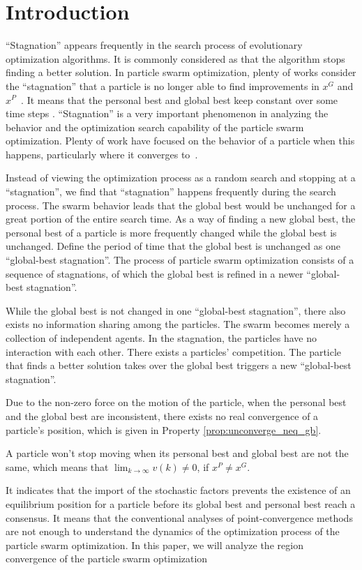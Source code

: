 \section{Introduction}
\label{sec:introduction}

``Stagnation'' appears frequently in the search process of evolutionary optimization algorithms. 
It is commonly considered as that the algorithm stops finding a better solution.
In particle swarm optimization,
plenty of works consider the ``stagnation'' that a particle is no longer able to find improvements in $ x^{G} $ and $ x^{P} $~\cite{Clerc06stagnationanalysis}.
It means that the personal best and global best keep constant over some time steps \cite{4223160}.
``Stagnation'' is a very important phenomenon in analyzing the behavior and the optimization search capability of the particle swarm optimization.
Plenty of work have focused on the behavior of a particle when this happens, particularly where it converges to~\cite{Schmitt:2013:PSO:2463372.2463563}\cite{Poli:2008:DSS:1384929.1384944}.

Instead of viewing the optimization process as a random search and stopping at a ``stagnation'', we find that ``stagnation'' happens frequently during the search process.
The swarm behavior leads that the global best would be unchanged for a great portion of the entire search time.
As a way of finding a new global best, the personal best of a particle is more frequently changed while the global best is unchanged. 
Define the period of time that the global best is unchanged as one ``global-best stagnation''.
The process of particle swarm optimization consists of a sequence of stagnations, of which the global best is refined in a newer ``global-best stagnation''.

While the global best is not changed in one ``global-best stagnation'', there also exists no information sharing among the particles.
The swarm becomes merely a collection of independent agents.
In the stagnation, the particles have no interaction with each other.
There exists a particles' competition.
The particle that finds a better solution takes over the global best triggers a new ``global-best stagnation''.

Due to the non-zero force on the motion of the particle, when the personal best and the global best are inconsistent, there exists no real convergence of a particle's position, which is given in Property \ref{prop:unconverge_neq_gb}.
\begin{myprop}
\label{prop:unconverge_neq_gb}
A particle won't stop moving when its personal best and global best are not the same, 
which means that 
$ \lim_{k \rightarrow \infty} v(k) \neq 0 $, if $ x^{P} \neq x^{G} $.
\end{myprop}
It indicates that the import of the stochastic factors prevents the existence of an equilibrium position for a particle before its global best and personal best reach a consensus.
It means that the conventional analyses of point-convergence methods are not enough to understand the dynamics of the optimization process of the particle swarm optimization.
In this paper, we will analyze the region convergence of the particle swarm optimization